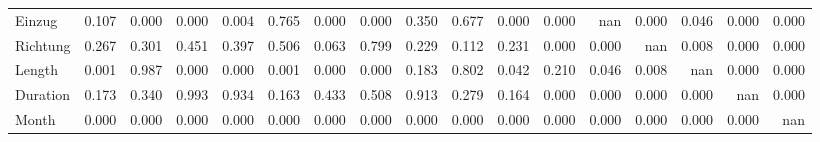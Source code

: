 \begin{tabular}{lrrrrrrrrrrrrrrrr}
Einzug        & 0.107 & 0.000 & 0.000 & 0.004 &  0.765 &  0.000 & 0.000 &  0.350 &  0.677 & 0.000 &          0.000 &     nan &     0.000 &   0.046 &     0.000 &  0.000 \\
Richtung      & 0.267 & 0.301 & 0.451 & 0.397 &  0.506 &  0.063 & 0.799 &  0.229 &  0.112 & 0.231 &          0.000 &   0.000 &       nan &   0.008 &     0.000 &  0.000 \\
Length        & 0.001 & 0.987 & 0.000 & 0.000 &  0.001 &  0.000 & 0.000 &  0.183 &  0.802 & 0.042 &          0.210 &   0.046 &     0.008 &     nan &     0.000 &  0.000 \\
Duration      & 0.173 & 0.340 & 0.993 & 0.934 &  0.163 &  0.433 & 0.508 &  0.913 &  0.279 & 0.164 &          0.000 &   0.000 &     0.000 &   0.000 &       nan &  0.000 \\
Month         & 0.000 & 0.000 & 0.000 & 0.000 &  0.000 &  0.000 & 0.000 &  0.000 &  0.000 & 0.000 &          0.000 &   0.000 &     0.000 &   0.000 &     0.000 &    nan \\
\bottomrule
\end{tabular}
